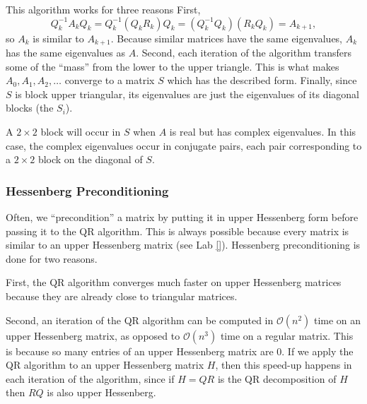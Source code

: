 This algorithm works for three reasons
First,
\[
Q_k^{-1}A_kQ_k = Q_k^{-1}(Q_kR_k)Q_k = (Q_k^{-1}Q_k)(R_kQ_k) = A_{k+1},
\]
so $A_k$ is similar to $A_{k+1}$.
Because similar matrices have the same eigenvalues, $A_k$ has the same eigenvalues as $A$.
Second, each iteration of the algorithm transfers some of the ``mass'' from the lower to the upper triangle.
This is what makes $A_0, A_1, A_2, \ldots$ converge to a matrix $S$ which has the described form.
Finally, since $S$ is block upper triangular, its eigenvalues are just the eigenvalues of its diagonal blocks (the $S_i$).

A $2 \times 2$ block will occur in $S$ when $A$ is real but has complex eigenvalues.
In this case, the complex eigenvalues occur in conjugate pairs, each pair corresponding to a $2 \times 2$ block on the diagonal of $S$.

\subsubsection*{Hessenberg Preconditioning} %

Often, we ``precondition'' a matrix by putting it in upper Hessenberg form before passing it to the QR algorithm.
This is always possible because every matrix is similar to an upper Hessenberg matrix (see Lab \ref{}).
Hessenberg preconditioning is done for two reasons.

First, the QR algorithm converges much faster on upper Hessenberg matrices because they are already close to triangular matrices.

Second, an iteration of the QR algorithm can be computed in $\mathcal{O}(n^2)$ time on an upper Hessenberg matrix, as opposed to $\mathcal{O}(n^3)$ time on a regular matrix.
This is because so many entries of an upper Hessenberg matrix are 0.
If we apply the QR algorithm to an upper Hessenberg matrix $H$, then this speed-up happens in each iteration of the algorithm, since if $H = QR$ is the QR decomposition of $H$ then $RQ$ is also upper Hessenberg.


